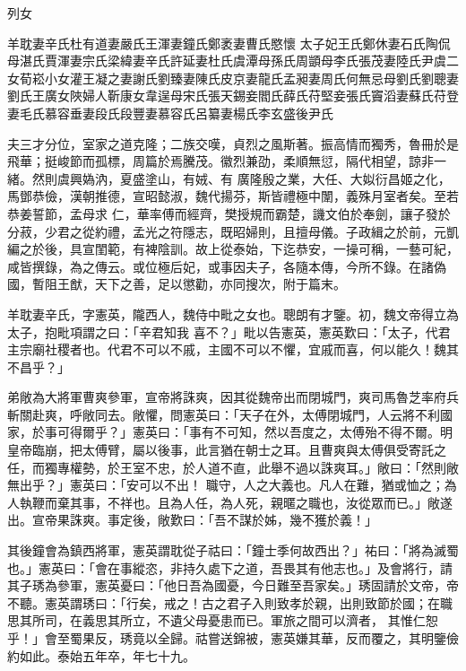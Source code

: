 
\begin{pinyinscope}

 列女



 羊耽妻辛氏杜有道妻嚴氏王渾妻鐘氏鄭袤妻曹氏愍懷
 太子妃王氏鄭休妻石氏陶侃母湛氏賈渾妻宗氏梁緯妻辛氏許延妻杜氏虞潭母孫氏周顗母李氏張茂妻陸氏尹虞二女荀崧小女灌王凝之妻謝氏劉臻妻陳氏皮京妻龍氏孟昶妻周氏何無忌母劉氏劉聰妻劉氏王廣女陜婦人靳康女韋逞母宋氏張天錫妾閻氏薛氏苻堅妾張氏竇滔妻蘇氏苻登妻毛氏慕容垂妻段氏段豐妻慕容氏呂纂妻楊氏李玄盛後尹氏


夫三才分位，室家之道克隆；二族交嘆，貞烈之風斯著。振高情而獨秀，魯冊於是飛華；挺峻節而孤標，周篇於焉騰茂。徽烈兼劭，柔順無愆，隔代相望，諒非一緒。然則虞興媯汭，夏盛塗山，有娀、有
 廣隆殷之業，大任、大姒衍昌姬之化，馬鄧恭儉，漢朝推德，宣昭懿淑，魏代揚芬，斯皆禮極中闈，義殊月室者矣。至若恭姜誓節，孟母求
 仁，華率傅而經齊，樊授規而霸楚，譏文伯於奉劍，讓子發於分菽，少君之從約禮，孟光之符隱志，既昭婦則，且擅母儀。子政緝之於前，元凱編之於後，具宣閨範，有裨陰訓。故上從泰始，下迄恭安，一操可稱，一藝可紀，咸皆撰錄，為之傳云。或位極后妃，或事因夫子，各隨本傳，今所不錄。在諸偽國，暫阻王猷，天下之善，足以懲勸，亦同搜次，附于篇末。



 羊耽妻辛氏，字憲英，隴西人，魏侍中毗之女也。聰朗有才鑒。初，魏文帝得立為太子，抱毗項謂之曰：「辛君知我
 喜不？」毗以告憲英，憲英歎曰：「太子，代君主宗廟社稷者也。代君不可以不戚，主國不可以不懼，宜戚而喜，何以能久！魏其不昌乎？」



 弟敞為大將軍曹爽參軍，宣帝將誅爽，因其從魏帝出而閉城門，爽司馬魯芝率府兵斬關赴爽，呼敞同去。敞懼，問憲英曰：「天子在外，太傅閉城門，人云將不利國家，於事可得爾乎？」憲英曰：「事有不可知，然以吾度之，太傅殆不得不爾。明皇帝臨崩，把太傅臂，屬以後事，此言猶在朝士之耳。且曹爽與太傅俱受寄託之任，而獨專權勢，於王室不忠，於人道不直，此舉不過以誅爽耳。」敞曰：「然則敞無出乎？」憲英曰：「安可以不出！
 職守，人之大義也。凡人在難，猶或恤之；為人執鞭而棄其事，不祥也。且為人任，為人死，親暱之職也，汝從眾而已。」敞遂出。宣帝果誅爽。事定後，敞歎曰：「吾不謀於姊，幾不獲於義！」



 其後鐘會為鎮西將軍，憲英謂耽從子祜曰：「鐘士季何故西出？」祐曰：「將為滅蜀也。」憲英曰：「會在事縱恣，非持久處下之道，吾畏其有他志也。」及會將行，請其子琇為參軍，憲英憂曰：「他日吾為國憂，今日難至吾家矣。」琇固請於文帝，帝不聽。憲英謂琇曰：「行矣，戒之！古之君子入則致孝於親，出則致節於國；在職思其所司，在義思其所立，不遺父母憂患而已。軍旅之間可以濟者，
 其惟仁恕乎！」會至蜀果反，琇竟以全歸。祜嘗送錦被，憲英嫌其華，反而覆之，其明鑒儉約如此。泰始五年卒，年七十九。




\end{pinyinscope}
